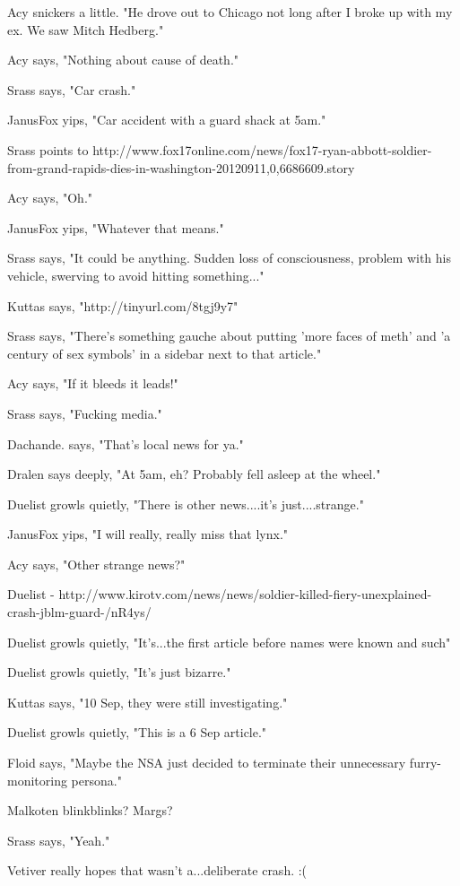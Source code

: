 Acy snickers a little. "He drove out to Chicago not long after I broke up with my ex.  We saw Mitch Hedberg."

Acy says, "Nothing about cause of death."

Srass says, "Car crash."

JanusFox yips, "Car accident with a guard shack at 5am."

Srass points to http://www.fox17online.com/news/fox17-ryan-abbott-soldier-from-grand-rapids-dies-in-washington-20120911,0,6686609.story

Acy says, "Oh."

JanusFox yips, "Whatever that means."

Srass says, "It could be anything.  Sudden loss of consciousness, problem with his vehicle, swerving to avoid hitting something..."

Kuttas says, "http://tinyurl.com/8tgj9y7"

Srass says, "There's something gauche about putting 'more faces of meth' and 'a century of sex symbols' in a sidebar next to that article."

Acy says, "If it bleeds it leads!"

Srass says, "Fucking media."

Dachande. says, "That's local news for ya."

Dralen says deeply, "At 5am, eh? Probably fell asleep at the wheel."

Duelist growls quietly, "There is other news....it's just....strange."

JanusFox yips, "I will really, really miss that lynx."

Acy says, "Other strange news?"

Duelist - http://www.kirotv.com/news/news/soldier-killed-fiery-unexplained-crash-jblm-guard-/nR4ys/

Duelist growls quietly, "It's...the first article before names were known and such"

Duelist growls quietly, "It's just bizarre."

Kuttas says, "10 Sep, they were still investigating."

Duelist growls quietly, "This is a 6 Sep article."

Floid says, "Maybe the NSA just decided to terminate their unnecessary furry-monitoring persona."

Malkoten blinkblinks?  Margs?

Srass says, "Yeah."

Vetiver really hopes that wasn't a...deliberate crash. :(

